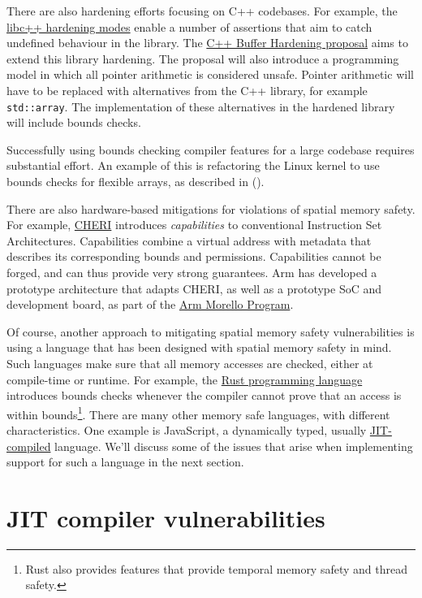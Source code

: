 \documentclass[
  a4paper,
]{report}
\begin{document}
There are also hardening efforts focusing on C++ codebases. For example,
the \href{https://libcxx.llvm.org/Hardening.html}{libc++ hardening
modes} enable a number of assertions that aim to catch undefined
behaviour in the library. The
\href{https://discourse.llvm.org/t/rfc-c-buffer-hardening/65734}{C++
Buffer Hardening proposal} aims to extend this library hardening. The
proposal will also introduce a programming model in which all pointer
arithmetic is considered unsafe. Pointer arithmetic will have to be
replaced with alternatives from the C++ library, for example
\texttt{std::array}. The implementation of these alternatives in the
hardened library will include bounds checks.

Successfully using bounds checking compiler features for a large
codebase requires substantial effort. An example of this is refactoring
the Linux kernel to use bounds checks for flexible arrays, as described
in ().

There are also hardware-based mitigations for violations of spatial
memory safety. For example,
\href{https://www.cl.cam.ac.uk/research/security/ctsrd/cheri/}{CHERI}
introduces \emph{capabilities} to conventional
Instruction Set Architectures. Capabilities combine a virtual address
with metadata that describes its corresponding bounds and permissions.
Capabilities cannot be forged, and can thus provide very strong
guarantees. Arm has developed a prototype architecture that adapts
CHERI, as well as a prototype SoC and development board, as part of the
\href{https://www.arm.com/architecture/cpu/morello}{Arm Morello
Program}.

Of course, another approach to mitigating spatial memory safety
vulnerabilities is using a language that has been designed with spatial
memory safety in mind. Such languages make sure that all memory accesses
are checked, either at compile-time or runtime. For example, the
\href{https://www.rust-lang.org/}{Rust programming language} introduces
bounds checks whenever the compiler cannot prove that an access is
within bounds\footnote{Rust also provides features that provide temporal
  memory safety and thread safety.}. There are many other memory safe
languages, with different characteristics. One example is JavaScript, a
dynamically typed, usually
\hyperref[jit-compiler-vulnerabilities]{JIT-compiled} language. We'll
discuss some of the issues that arise when implementing support for such
a language in the next section.

\section{JIT compiler
vulnerabilities}\label{sec:jit-compiler-vulnerabilities}
\end{document}

